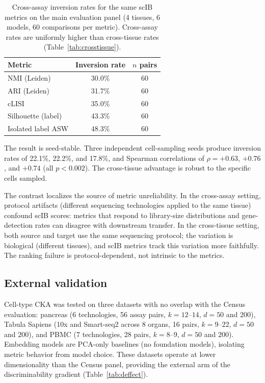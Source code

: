 \documentclass[11pt]{article}
\begin{document}
\begin{table}[t]
\centering
\caption{Cross-assay inversion rates for the same scIB metrics on the
main evaluation panel (4 tissues, 6 models, 60 comparisons per metric).
Cross-assay rates are uniformly higher than cross-tissue rates
(Table~\ref{tab:crosstissue}).}
\label{tab:crossassay_inv}
\small
\begin{tabular}{@{}lcc@{}}
\toprule
Metric & Inversion rate & $n$ pairs \\
\midrule
NMI (Leiden)         & 30.0\% & 60 \\
ARI (Leiden)         & 31.7\% & 60 \\
cLISI                & 35.0\% & 60 \\
Silhouette (label)   & 43.3\% & 60 \\
Isolated label ASW   & 48.3\% & 60 \\
\bottomrule
\end{tabular}
\end{table}

The result is seed-stable. Three independent cell-sampling seeds produce
inversion rates of 22.1\%, 22.2\%, and 17.8\%, and Spearman
correlations of $\rho = +0.63$, $+0.76$, and $+0.74$ (all
$p < 0.002$). The cross-tissue advantage is robust to the specific
cells sampled.

The contrast localizes the source of metric unreliability. In the
cross-assay setting, protocol artifacts (different sequencing
technologies applied to the same tissue) confound scIB scores: metrics
that respond to library-size distributions and gene-detection rates
can disagree with downstream transfer. In the cross-tissue setting, both
source and target use the same sequencing protocol; the variation is
biological (different tissues), and scIB metrics track this variation
more faithfully. The ranking failure is protocol-dependent, not
intrinsic to the metrics.


\subsection{External validation}
\label{sec:external}

Cell-type CKA was tested on three datasets with no overlap with the
Census evaluation: pancreas \citep{luecken2022scib} (6 technologies, 56
assay pairs, $k = 12$--$14$, $d = 50$ and $200$), Tabula Sapiens
\citep{tabulasapiens2022} (10x and Smart-seq2 across 8 organs, 16
pairs, $k = 9$--$22$, $d = 50$ and $200$), and PBMC
\citep{ding2020systematic} (7 technologies, 28 pairs, $k = 8$--$9$,
$d = 50$ and $200$). Embedding models are PCA-only baselines (no
foundation models), isolating metric behavior from model choice. These
datasets operate at lower dimensionality than the Census panel,
providing the external arm of the discriminability gradient
(Table~\ref{tab:deffect}).
\end{document}

